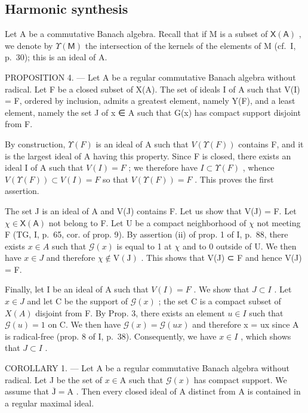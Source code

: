 \subsection{Harmonic synthesis}

Let A be a commutative Banach algebra. Recall that if M is a subset of \(\mathsf{X}(\mathsf{A})\) , we denote by \(\Upsilon(\mathsf{M})\) the intersection of the kernels of the elements of M (cf.~I, p.~30); this is an ideal of A.

PROPOSITION 4. --- Let A be a regular commutative Banach algebra without radical. Let F be a closed subset of X(A). The set of ideals I of A such that V(I) = F, ordered by inclusion, admits a greatest element, namely Y(F), and a least element, namely the set J of x ∈ A such that G(x) has compact support disjoint from F.

By construction, \(\Upsilon(F)\) is an ideal of A such that \(V(\Upsilon(F))\) contains F, and it is the largest ideal of A having this property. Since F is closed, there exists an ideal I of A such that \(V(I) = F\) ; we therefore have \(I \subset \Upsilon(F)\) , whence \(V(\Upsilon(F)) \subset V(I) = F\) so that \(V(\Upsilon(F)) = F\) . This proves the first assertion.

The set J is an ideal of A and V(J) contains F. Let us show that V(J) = F. Let \(\chi \in \mathsf{X}(\mathsf{A})\) not belong to F. Let U be a compact neighborhood of \(\chi\) not meeting F (TG, I, p.~65, cor. of prop. 9). By assertion (ii) of prop. 1 of I, p.~88, there exists \(x \in A\) such that \(\mathcal{G}(x)\) is equal to 1 at \(\chi\) and to 0 outside of U. We then have \(x \in J\) and therefore \(\chi \notin \mathrm{V}(\mathrm{J})\) . This shows that V(J) ⊂ F and hence V(J) = F.

Finally, let I be an ideal of A such that \(V(I) = F\) . We show that \(J \subset I\) . Let \(x \in J\) and let C be the support of \(\mathcal{G}(x)\) ; the set C is a compact subset of \(X(A)\) disjoint from F. By Prop. 3, there exists an element \(u \in I\) such that \(\mathcal{G}(u) = 1\) on C. We then have \(\mathcal{G}(x) = \mathcal{G}(ux)\) and therefore x = ux since A is radical-free (prop. 8 of I, p.~38). Consequently, we have \(x \in I\) , which shows that \(J \subset I\) .

COROLLARY 1. --- Let A be a regular commutative Banach algebra without radical. Let J be the set of \(x \in \mathrm{A}\) such that \(\mathcal{G}(x)\) has compact support. We assume that \(\overline{\mathrm{J}} = \mathrm{A}\) . Then every closed ideal of A distinct from A is contained in a regular maximal ideal.


